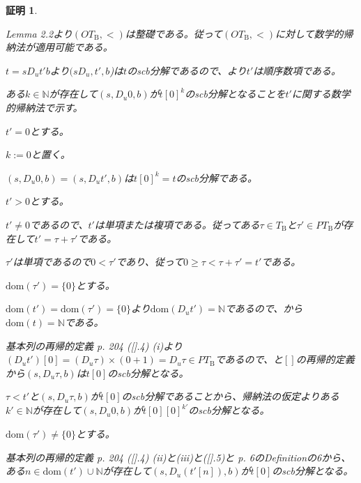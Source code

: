 \documentclass[dvipdfmx,uplatex]{jsarticle}
\theoremstyle{customnonumberbreakfortheorem}
\theoremstyle{customnonumberbreakforproof}
\newtheorem{hideableproof}{証明}
\begin{document}
\begin{hideableproof}
	\begin{indented}
		\item \cite{buc1} Lemma 2.2より\((OT_{\textrm{B}},<)\)は整礎である。従って\((OT_{\textrm{B}},<)\)に対して数学的帰納法が適用可能である。
		\item \(t = s D_u t' b\)より\((s D_u,t',b\))は\(t\)のscb分解であるので、より\(t'\)は順序数項である。
		\item ある\(k \in \mathbb{N}\)が存在して\((s,D_u 0,b)\)が\(t[0]^k\)のscb分解となることを\(t'\)に関する数学的帰納法で示す。
		\item \(t' = 0\)とする。
		\begin{indented}
			\item \(k := 0\)と置く。
			\item \((s,D_u 0,b) = (s,D_u t',b)\)は\(t[0]^k = t\)のscb分解である。
		\end{indented}
		\item \(t' > 0\)とする。
		\begin{indented}
			\item \(t' \neq 0\)であるので、\(t'\)は単項または複項である。従ってある\(\tau \in T_{\textrm{B}}\)と\(\tau' \in PT_{\textrm{B}}\)が存在して\(t' = \tau + \tau'\)である。
			\item \(\tau'\)は単項であるので\(0 < \tau'\)であり、従って\(0 \geq \tau < \tau + \tau' = t'\)である。
			\item \(\textrm{dom}(\tau') = \{0\}\)とする。
			\begin{indented}
				\item \(\textrm{dom}(t') = \textrm{dom}(\tau') = \{0\}\)より\(\textrm{dom}(D_u t') = \mathbb{N}\)であるので、から\(\textrm{dom}(t) = \mathbb{N}\)である。
				\item 基本列の再帰的定義\cite{buc1} p. 204 ([].4) (i)より\((D_u t')[0] = (D_u \tau) \times (0+1) = D_u \tau \in PT_{\textrm{B}}\)であるので、と\([]\)の再帰的定義から\((s,D_u \tau,b)\)は\(t[0]\)のscb分解となる。
				\item \(\tau < t'\)と\((s,D_u \tau,b)\)が\(t[0]\)のscb分解であることから、帰納法の仮定よりある\(k' \in \mathbb{N}\)が存在して\((s,D_u 0,b)\)が\(t[0][0]^{k'}\)のscb分解となる。
			\end{indented}
			\item \(\textrm{dom}(\tau') \neq \{0\}\)とする。
			\begin{indented}
				\item 基本列の再帰的定義\cite{buc1} p. 204 ([].4) (ii)と(iii)と([].5)と\cite{buc2} p. 6のDefinitionの6から、ある\(n \in \textrm{dom}(t') \cup \mathbb{N}\)が存在して\((s,D_u(t'[n]),b)\)が\(t[0]\)のscb分解となる。

\end{indented}
\end{indented}
\end{indented}
\end{hideableproof}
\end{document}
